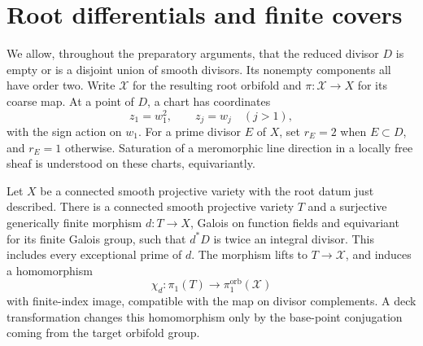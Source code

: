 \section{Root differentials and finite covers}\label{in:foundations}

We allow, throughout the preparatory arguments, that the reduced divisor
\(D\) is empty or is a disjoint union of smooth divisors.  Its nonempty
components all have order two.  Write \(\mathcal X\) for the resulting
root orbifold and \(\pi:\mathcal X\to X\) for its coarse map.  At a point
of \(D\), a chart has coordinates
\[
 z_1=w_1^2,\qquad z_j=w_j\quad(j>1),
\]
with the sign action on \(w_1\).  For a prime divisor \(E\) of \(X\), set
\(r_E=2\) when \(E\subset D\), and \(r_E=1\) otherwise.  Saturation of a
meromorphic line direction in a locally free sheaf is understood on
these charts, equivariantly.

\begin{lemma}\label{in:auxiliary}
Let \(X\) be a connected smooth projective variety with the root datum
just described.  There is a connected smooth projective variety \(T\)
and a surjective generically finite morphism \(d:T\to X\), Galois on
function fields and equivariant for its finite Galois group, such that
\(d^*D\) is twice an integral divisor.  This includes every exceptional
prime of \(d\).  The morphism lifts to \(T\to\mathcal X\), and induces a
homomorphism
\[
 \chi_d:\pi_1(T)\longrightarrow \pi_1^{\mathrm{orb}}(\mathcal X)
\]
with finite-index image, compatible with the map on divisor
complements.  A deck transformation changes this homomorphism only by
the base-point conjugation coming from the target orbifold group.
\end{lemma}

